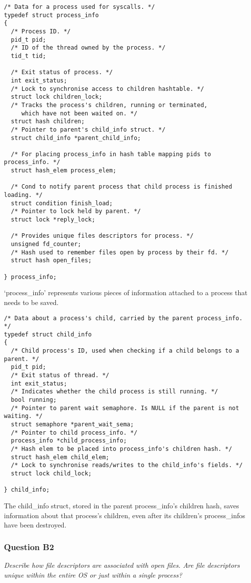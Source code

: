 \begin{verbatim}
/* Data for a process used for syscalls. */
typedef struct process_info
{
  /* Process ID. */
  pid_t pid;
  /* ID of the thread owned by the process. */
  tid_t tid;

  /* Exit status of process. */
  int exit_status;
  /* Lock to synchronise access to children hashtable. */
  struct lock children_lock;
  /* Tracks the process's children, running or terminated,
     which have not been waited on. */
  struct hash children;
  /* Pointer to parent's child_info struct. */
  struct child_info *parent_child_info;

  /* For placing process_info in hash table mapping pids to process_info. */
  struct hash_elem process_elem;

  /* Cond to notify parent process that child process is finished loading. */
  struct condition finish_load;
  /* Pointer to lock held by parent. */
  struct lock *reply_lock;

  /* Provides unique files descriptors for process. */
  unsigned fd_counter;
  /* Hash used to remember files open by process by their fd. */
  struct hash open_files;

} process_info;
\end{verbatim}
`process\_info' represents various pieces of information attached to a process
that needs to be saved.

\begin{verbatim}
/* Data about a process's child, carried by the parent process_info. */
typedef struct child_info
{
  /* Child process's ID, used when checking if a child belongs to a parent. */
  pid_t pid;
  /* Exit status of thread. */
  int exit_status;
  /* Indicates whether the child process is still running. */
  bool running;
  /* Pointer to parent wait semaphore. Is NULL if the parent is not waiting. */
  struct semaphore *parent_wait_sema;
  /* Pointer to child process_info. */
  process_info *child_process_info;
  /* Hash elem to be placed into process_info's children hash. */
  struct hash_elem child_elem;
  /* Lock to synchronise reads/writes to the child_info's fields. */
  struct lock child_lock;

} child_info;
\end{verbatim}

The child\_info struct, stored in the parent process\_info's children hash, saves information about that process's children, even after its children's process\_infos have been destroyed.

\subsubsection*{Question B2} %
\textit{Describe how file descriptors are associated with open files. Are file descriptors unique within the entire OS or just within a single process?}

